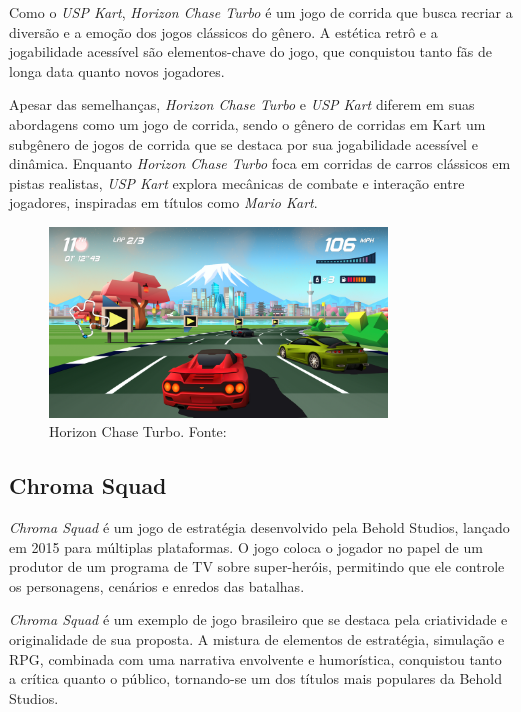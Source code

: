 Como o \textit{USP Kart}, \textit{Horizon Chase Turbo} é um jogo de corrida que busca recriar a diversão e a emoção dos jogos clássicos do gênero. A estética retrô e a jogabilidade acessível são elementos-chave do jogo, que conquistou tanto fãs de longa data quanto novos jogadores.

Apesar das semelhanças, \textit{Horizon Chase Turbo} e \textit{USP Kart} diferem em suas abordagens como um jogo de corrida, sendo o gênero de corridas em Kart um subgênero de jogos de corrida que se destaca por sua jogabilidade acessível e dinâmica. Enquanto \textit{Horizon Chase Turbo} foca em corridas de carros clássicos em pistas realistas, \textit{USP Kart} explora mecânicas de combate e interação entre jogadores, inspiradas em títulos como \textit{Mario Kart}.

\begin{figure}[H]
    \centering
    \includegraphics[width=0.8\textwidth]{figuras/Horizon Chase Turbo.jpeg}
    \caption{Horizon Chase Turbo. Fonte: \cite{horizonChaseTurbo}}
    \label{fig:horizon-chase-turbo}
\end{figure}

\subsection{Chroma Squad}
\textit{Chroma Squad} é um jogo de estratégia desenvolvido pela Behold Studios, lançado em 2015 para múltiplas plataformas. O jogo coloca o jogador no papel de um produtor de um programa de TV sobre super-heróis, permitindo que ele controle os personagens, cenários e enredos das batalhas.

\textit{Chroma Squad} é um exemplo de jogo brasileiro que se destaca pela criatividade e originalidade de sua proposta. A mistura de elementos de estratégia, simulação e RPG, combinada com uma narrativa envolvente e humorística, conquistou tanto a crítica quanto o público, tornando-se um dos títulos mais populares da Behold Studios.

